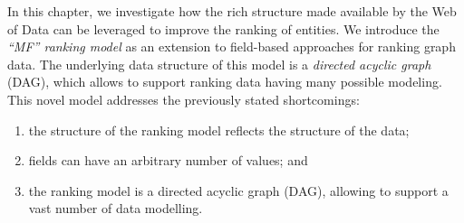 In this chapter, we investigate how the rich structure made available by the Web of Data can be leveraged to improve the ranking of entities. We introduce the \emph{``MF'' ranking model} as an extension to field-based approaches for ranking graph data. The underlying data structure of this model is a \emph{directed acyclic graph} (DAG), which allows to support ranking data having many possible modeling. This novel model addresses the previously stated shortcomings:
\begin{enumerate}
	\item the structure of the ranking model reflects the structure of the data;
	\item fields can have an arbitrary number of values; and
	\item the ranking model is a directed acyclic graph (DAG), allowing to support a vast number of data modelling.
\end{enumerate}
